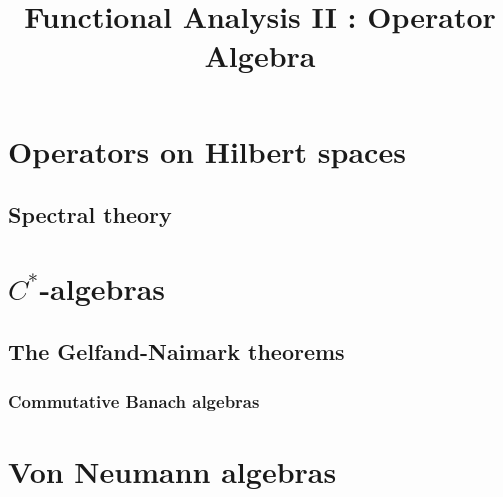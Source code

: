 \documentclass{../crs}
\title{Functional Analysis II : Operator Algebra}
\begin{document}
\maketitle
\tableofcontents


\chapter{Operators on Hilbert spaces}

\section{Spectral theory}

\chapter{$C^*$-algebras}


\section{The Gelfand-Naimark theorems}
\subsection{Commutative Banach algebras}



\chapter{Von Neumann algebras}
\end{document}
